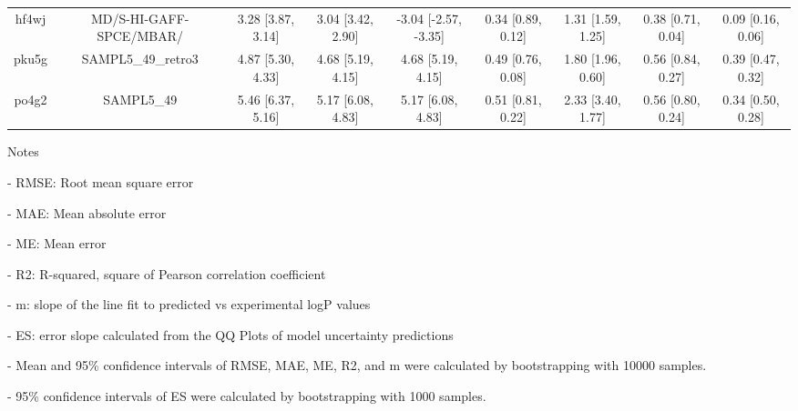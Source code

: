 \documentclass{article}
\begin{document}
\begin{center}
\begin{longtable}{|ccccccccc|}
 hf4wj &                            MD/S-HI-GAFF-SPCE/MBAR/ &  3.28 [3.87, 3.14] &  3.04 [3.42, 2.90] &  -3.04 [-2.57, -3.35] &  0.34 [0.89, 0.12] &     1.31 [1.59, 1.25] &     0.38 [0.71, 0.04] &     0.09 [0.16, 0.06] \\
 pku5g &                                 SAMPL5\_49\_retro3 &  4.87 [5.30, 4.33] &  4.68 [5.19, 4.15] &     4.68 [5.19, 4.15] &  0.49 [0.76, 0.08] &     1.80 [1.96, 0.60] &     0.56 [0.84, 0.27] &     0.39 [0.47, 0.32] \\
 po4g2 &                                         SAMPL5\_49 &  5.46 [6.37, 5.16] &  5.17 [6.08, 4.83] &     5.17 [6.08, 4.83] &  0.51 [0.81, 0.22] &     2.33 [3.40, 1.77] &     0.56 [0.80, 0.24] &     0.34 [0.50, 0.28] \\
\end{longtable}
\end{center}

Notes

- RMSE: Root mean square error

- MAE: Mean absolute error

- ME: Mean error

- R2: R-squared, square of Pearson correlation coefficient

- m: slope of the line fit to predicted vs experimental logP values

- ES: error slope calculated from the QQ Plots of model uncertainty predictions

- Mean and 95\% confidence intervals of RMSE, MAE, ME, R2, and m were calculated by bootstrapping with 10000 samples.

- 95\% confidence intervals of ES were calculated by bootstrapping with 1000 samples.\end{document}
\end{document}
